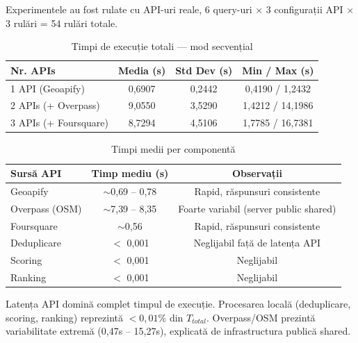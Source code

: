 \documentclass[12pt,a4paper]{article}
\newcommand{\thead}[1]{\cellcolor{tblh}\color{white}\textbf{#1}}
\begin{document}
Experimentele au fost rulate cu API-uri reale, 6 query-uri $\times$ 3 configurații API $\times$ 3 rulări = 54 rulări totale.

\begin{table}[H]
\centering
\begin{tabular}{lccc}
\toprule
\thead{Nr. APIs} & \thead{Media (s)} & \thead{Std Dev (s)} & \thead{Min / Max (s)} \\
\midrule
1 API (Geoapify)             & 0{,}6907 & 0{,}2442 & 0{,}4190 / 1{,}2432 \\
2 APIs (+ Overpass)          & 9{,}0550 & 3{,}5290 & 1{,}4212 / 14{,}1986 \\
3 APIs (+ Foursquare)        & 8{,}7294 & 4{,}5106 & 1{,}7785 / 16{,}7381 \\
\bottomrule
\end{tabular}
\caption{Timpi de execuție totali --- mod secvențial}
\end{table}

\begin{table}[H]
\centering
\begin{tabular}{lcc}
\toprule
\thead{Sursă API} & \thead{Timp mediu (s)} & \thead{Observații} \\
\midrule
Geoapify        & $\sim$0{,}69 -- 0{,}78 & Rapid, răspunsuri consistente \\
Overpass (OSM)  & $\sim$7{,}39 -- 8{,}35 & Foarte variabil (server public shared) \\
Foursquare      & $\sim$0{,}56           & Rapid, răspunsuri consistente \\
\midrule
Deduplicare     & $<$ 0{,}001            & Neglijabil față de latența API \\
Scoring         & $<$ 0{,}001            & Neglijabil \\
Ranking         & $<$ 0{,}001            & Neglijabil \\
\bottomrule
\end{tabular}
\caption{Timpi medii per componentă}
\end{table}

\begin{notebox}
Latența API domină complet timpul de execuție. Procesarea locală (deduplicare, scoring, ranking) reprezintă $<0{,}01\%$ din $T_{total}$. Overpass/OSM prezintă variabilitate extremă (0{,}47s -- 15{,}27s), explicată de infrastructura publică shared.
\end{notebox}

\end{document}
